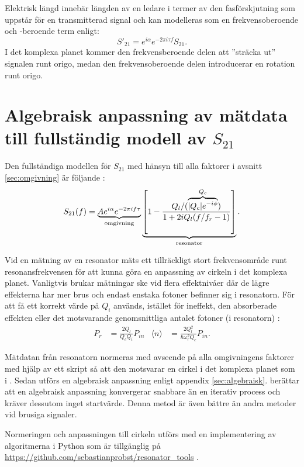 \documentclass[main.tex]{subfiles}
\begin{document}
Elektrisk längd innebär längden av en ledare i termer av den fasförskjutning som uppstår för en transmitterad signal \cite{Schmitt2002} och kan modelleras som en frekvensoberoende och -beroende term enligt:
\begin{equation}
    S'_{21} = e^{i\alpha}e^{-2\pi i\tau f}S_{21}.
\end{equation}
I det komplexa planet kommer den frekvensberoende delen att ''sträcka ut'' signalen runt origo, medan den frekvensoberoende delen introducerar en rotation runt origo.

\section{Algebraisk anpassning av mätdata till fullständig modell av $S_{21}$}
Den fullständiga modellen för $S_{21}$ med hänsyn till alla faktorer i avsnitt \ref{sec:omgivning} är följande \cite{Probst2015}:
\begin{equation}
    S_{21}(f)=\underbrace{A e^{i\alpha}e^{-2\pi i f\tau}}_\text{omgivning}\underbrace{\qty[1-\frac{Q_l/(\overbrace{|Q_c|e^{-i\phi}}^{Q_c})}{1+2iQ_l\qty(f/f_r-1)}]}_\text{resonator}.
\label{eq:S21}
\end{equation}

Vid en mätning av en resonator mäts ett tillräckligt stort frekvensområde runt resonansfrekvensen för att kunna göra en anpassning av cirkeln i det komplexa planet. Vanligtvis brukar mätningar ske vid flera effektnivåer där de lägre effekterna har mer brus och endast enstaka fotoner befinner sig i resonatorn. För att få ett korrekt värde på $Q_i$ används, istället för ineffekt, den absorberade effekten eller det motsvarande genomsnittliga antalet fotoner (i resonatorn) \cite{Boehme2016}:
\begin{align}
    P_r&=\frac{2Q_l}{Q_cQ_i}P_{in}
    &
    \langle n \rangle &=\frac{2Q^2_l}{\hbar \omega^2_r Q_c}P_{in}.
\end{align}

Mätdatan från resonatorn normeras med avseende på alla omgivningens faktorer med hjälp av ett skript så att den motsvarar en cirkel i det komplexa planet som i . Sedan utförs en algebraisk anpassning enligt appendix \ref{sec:algebraisk}. \citeauthor{Probst2015} \cite{Probst2015} berättar att en algebraisk anpassning konvergerar snabbare än en iterativ process och kräver dessutom inget startvärde. Denna metod är även bättre än andra metoder vid brusiga signaler.

Normeringen och anpassningen till cirkeln utförs med en implementering av algoritmerna i Python som är tillgänglig på \url{https://github.com/sebastianprobst/resonator_tools} \cite{Probst2015}.
\end{document}
